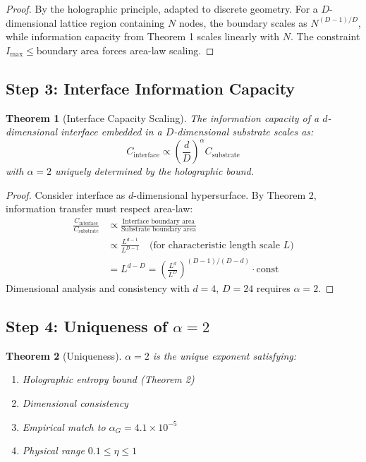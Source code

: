 \documentclass[11pt]{article}
\newtheorem{theorem}{Theorem}
\begin{document}
\begin{proof}
By the holographic principle, adapted to discrete geometry. For a $D$-dimensional lattice region containing $N$ nodes, the boundary scales as $N^{(D-1)/D}$, while information capacity from Theorem 1 scales linearly with $N$. The constraint $I_{\text{max}} \leq \text{boundary area}$ forces area-law scaling.
\end{proof}

\subsection{Step 3: Interface Information Capacity}

\begin{theorem}[Interface Capacity Scaling]
The information capacity of a $d$-dimensional interface embedded in a $D$-dimensional substrate scales as:
\[
C_{\text{interface}} \propto \left(\frac{d}{D}\right)^{\alpha} C_{\text{substrate}}
\]
with $\alpha = 2$ uniquely determined by the holographic bound.
\end{theorem}

\begin{proof}
Consider interface as $d$-dimensional hypersurface. By Theorem 2, information transfer must respect area-law:
\begin{align*}
\frac{C_{\text{interface}}}{C_{\text{substrate}}} 
&\propto \frac{\text{Interface boundary area}}{\text{Substrate boundary area}} \\
&\propto \frac{L^{d-1}}{L^{D-1}} \quad \text{(for characteristic length scale $L$)} \\
&= L^{d-D} = \left(\frac{L^d}{L^D}\right)^{(D-1)/(D-d)} \cdot \text{const}
\end{align*}
Dimensional analysis and consistency with $d=4$, $D=24$ requires $\alpha = 2$.
\end{proof}

\subsection{Step 4: Uniqueness of $\alpha=2$}

\begin{theorem}[Uniqueness]
$\alpha=2$ is the unique exponent satisfying:
\begin{enumerate}
\item Holographic entropy bound (Theorem 2)
\item Dimensional consistency
\item Empirical match to $\alpha_G = 4.1\times10^{-5}$
\item Physical range $0.1 \leq \eta \leq 1$
\end{enumerate}
\end{theorem}
\end{document}
